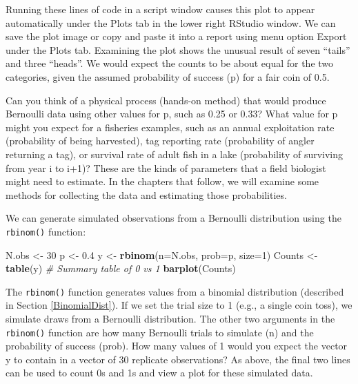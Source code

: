 \documentclass[
]{krantz}
\makeatletter
\newenvironment{Shaded}{\begin{snugshade}}{\end{snugshade}}
\newcommand{\AttributeTok}[1]{\textcolor[rgb]{0.27,0.27,0.27}{#1}}
\newcommand{\CommentTok}[1]{\textcolor[rgb]{0.37,0.37,0.37}{\textit{#1}}}
\newcommand{\DecValTok}[1]{\textcolor[rgb]{0.06,0.06,0.06}{#1}}
\newcommand{\FloatTok}[1]{\textcolor[rgb]{0.06,0.06,0.06}{#1}}
\newcommand{\FunctionTok}[1]{\textcolor[rgb]{0.27,0.27,0.27}{\textbf{#1}}}
\newcommand{\NormalTok}[1]{#1}
\newcommand{\OtherTok}[1]{\textcolor[rgb]{0.37,0.37,0.37}{#1}}
\newenvironment{kframe}{%
\medskip{}
\setlength{\fboxsep}{.8em}
 \def\at@end@of@kframe{}%
 \ifinner\ifhmode%
  \def\at@end@of@kframe{\end{minipage}}%
  \begin{minipage}{\columnwidth}%
 \fi\fi%
 \def\FrameCommand##1{\hskip\@totalleftmargin \hskip-\fboxsep
 \colorbox{shadecolor}{##1}\hskip-\fboxsep
     \hskip-\linewidth \hskip-\@totalleftmargin \hskip\columnwidth}%
 \MakeFramed {\advance\hsize-\width
   \@totalleftmargin\z@ \linewidth\hsize
   \@setminipage}}%
 {\par\unskip\endMakeFramed%
 \at@end@of@kframe}
\renewenvironment{Shaded}{\begin{kframe}}{\end{kframe}}
\makeatother
\begin{document}
Running these lines of code in a script window causes this plot to appear automatically under the Plots tab in the lower right RStudio window. We can save the plot image or copy and paste it into a report using menu option Export under the Plots tab. Examining the plot shows the unusual result of seven ``tails'' and three ``heads''. We would expect the counts to be about equal for the two categories, given the assumed probability of success (p) for a fair coin of 0.5.

Can you think of a physical process (hands-on method) that would produce Bernoulli data using other values for p, such as 0.25 or 0.33? What value for p might you expect for a fisheries examples, such as an annual exploitation rate (probability of being harvested), tag reporting rate (probability of angler returning a tag), or survival rate of adult fish in a lake (probability of surviving from year i to i+1)? These are the kinds of parameters that a field biologist might need to estimate. In the chapters that follow, we will examine some methods for collecting the data and estimating those probabilities.

We can generate simulated observations from a Bernoulli distribution using the \texttt{rbinom()} function:

\begin{Shaded}
\begin{Highlighting}[]
\NormalTok{N.obs }\OtherTok{\textless{}{-}} \DecValTok{30}
\NormalTok{p }\OtherTok{\textless{}{-}} \FloatTok{0.4}
\NormalTok{y }\OtherTok{\textless{}{-}} \FunctionTok{rbinom}\NormalTok{(}\AttributeTok{n=}\NormalTok{N.obs, }\AttributeTok{prob=}\NormalTok{p, }\AttributeTok{size=}\DecValTok{1}\NormalTok{)}
\NormalTok{Counts }\OtherTok{\textless{}{-}} \FunctionTok{table}\NormalTok{(y)  }\CommentTok{\# Summary table of 0 vs 1}
\FunctionTok{barplot}\NormalTok{(Counts)}
\end{Highlighting}
\end{Shaded}

The \texttt{rbinom()} function generates values from a binomial distribution (described in Section \ref{BinomialDist}). If we set the trial size to 1 (e.g., a single coin toss), we simulate draws from a Bernoulli distribution. The other two arguments in the \texttt{rbinom()} function are how many Bernoulli trials to simulate (n) and the probability of success (prob). How many values of 1 would you expect the vector y to contain in a vector of 30 replicate observations? As above, the final two lines can be used to count 0s and 1s and view a plot for these simulated data.
\end{document}
